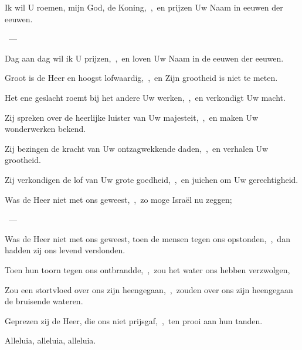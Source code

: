 \documentclass[12pt,twoside,a5paper]{article}
\begin{document}
\begin{halfparskip}
  Ik wil U roemen, mijn God, de Koning,~\sep\ en prijzen Uw Naam in eeuwen der eeuwen.

  ~--- 

  Dag aan dag wil ik U prijzen,~\sep\ en loven Uw Naam in de eeuwen der eeuwen.

  Groot is de Heer en hoogst lofwaardig,~\sep\ en Zijn grootheid is niet te meten.

  Het ene geslacht roemt bij het andere Uw werken,~\sep\ en verkondigt Uw macht.

  Zij spreken over de heerlijke luister van Uw majesteit,~\sep\ en maken Uw wonderwerken bekend.

  Zij bezingen de kracht van Uw ontzagwekkende daden,~\sep\ en verhalen Uw grootheid.

  Zij verkondigen de lof van Uw grote goedheid,~\sep\ en juichen om Uw gerechtigheid.
\end{halfparskip}

\begin{halfparskip}
   
\end{halfparskip}

\begin{halfparskip}
  Was de Heer niet met ons geweest,~\sep\ zo moge Israël nu zeggen;

  ~--- 

  Was de Heer niet met ons geweest, toen de mensen tegen ons opstonden,~\sep\ dan hadden zij ons levend verslonden.

  Toen hun toorn tegen ons ontbrandde,~\sep\ zou het water ons hebben verzwolgen,

  Zou een stortvloed over ons zijn heengegaan,~\sep\ zouden over ons zijn heengegaan de bruisende wateren.

  Geprezen zij de Heer, die ons niet prijsgaf,~\sep\ ten prooi aan hun tanden.
\end{halfparskip}

\begin{halfparskip}
   Alleluia, alleluia, alleluia.
\end{halfparskip}


\end{document}
